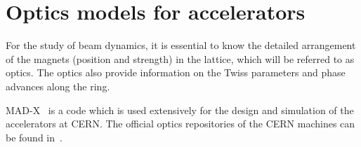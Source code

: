 


\section{Optics models for accelerators}\label{sec:optics_model_designs}
For the study of beam dynamics, it is essential to know the detailed arrangement of the magnets (position and strength) in the lattice, which will be referred to as optics. The optics also provide information on the Twiss parameters and phase advances along the ring.

MAD-X~\cite{madx} is a code which is used extensively for the design and simulation of the accelerators at CERN. The official optics repositories of the CERN machines can be found in~\cite{cern_optics_repo}.

